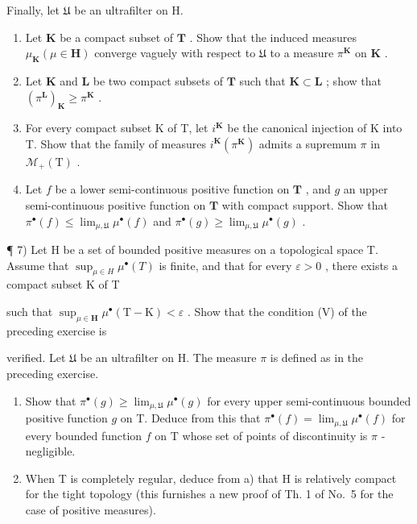 Finally, let \(\mathfrak{U}\) be an ultrafilter on H.

\begin{enumerate}
\def\labelenumi{\alph{enumi})}
\item
  Let \(\mathbf{K}\) be a compact subset of \(\mathbf{T}\) . Show that the induced measures \(\mu_{\mathbf{K}} (\mu \in \mathbf{H})\) converge vaguely with respect to \(\mathfrak{U}\) to a measure \(\pi^{\mathbf{K}}\) on \(\mathbf{K}\) .
\item
  Let \(\mathbf{K}\) and \(\mathbf{L}\) be two compact subsets of \(\mathbf{T}\) such that \(\mathbf{K} \subset \mathbf{L}\) ; show that \((\pi^{\mathbf{L}})_{\mathbf{K}} \geqslant \pi^{\mathbf{K}}\) .
\item
  For every compact subset K of T, let \(i^{\mathbf{K}}\) be the canonical injection of K into T. Show that the family of measures \(i^{\mathbf{K}}(\pi^{\mathbf{K}})\) admits a supremum \(\pi\) in \(\mathcal{M}_{+}(\mathrm{T})\) .
\item
  Let \(f\) be a lower semi-continuous positive function on \(\mathbf{T}\) , and \(g\) an upper semi-continuous positive function on \(\mathbf{T}\) with compact support. Show that \(\pi^{\bullet}(f) \leqslant \lim_{\mu, \mathfrak{U}} \mu^{\bullet}(f)\) and \(\pi^{\bullet}(g) \geqslant \lim_{\mu, \mathfrak{U}} \mu^{\bullet}(g)\) .
\end{enumerate}

¶ 7) Let H be a set of bounded positive measures on a topological space T. Assume that \(\sup_{\mu\in H}\mu^{\bullet}(T)\) is finite, and that for every \(\varepsilon>0\) , there exists a compact subset K of T

such that \(\sup_{\mu \in \mathbf{H}}\mu^{\bullet}(\mathrm{T} - \mathrm{K}) < \varepsilon\) . Show that the condition (V) of the preceding exercise is

verified. Let \(\mathfrak{U}\) be an ultrafilter on H. The measure \(\pi\) is defined as in the preceding exercise.

\begin{enumerate}
\def\labelenumi{\alph{enumi})}
\item
  Show that \(\pi^{\bullet}(g) \geqslant \lim_{\mu, \mathfrak{U}} \mu^{\bullet}(g)\) for every upper semi-continuous bounded positive function \(g\) on T. Deduce from this that \(\pi^{\bullet}(f) = \lim_{\mu, \mathfrak{U}} \mu^{\bullet}(f)\) for every bounded function \(f\) on T whose set of points of discontinuity is \(\pi\) -negligible.
\item
  When T is completely regular, deduce from a) that H is relatively compact for the tight topology (this furnishes a new proof of Th. 1 of No.~5 for the case of positive measures).
\end{enumerate}

